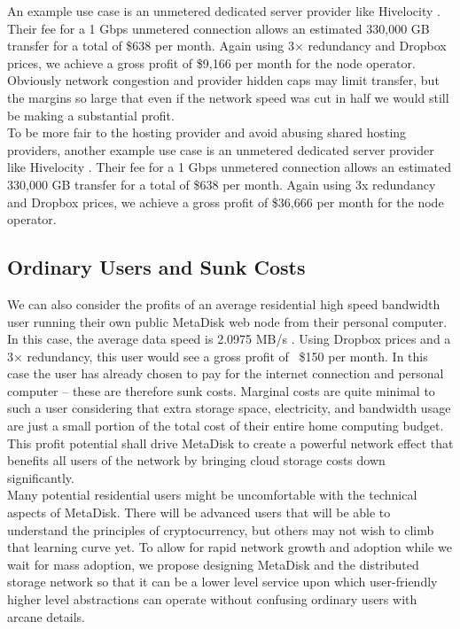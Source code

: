 \documentclass[a4paper,10pt]{article}
\begin{document}
An example use case is an unmetered dedicated server provider like Hivelocity \cite{9}.  Their fee for a 1 Gbps unmetered connection allows an estimated 330,000 GB transfer for a total of \$638 per month. Again using 3× redundancy and Dropbox prices, we achieve a gross profit of \$9,166 per month for the node operator. Obviously network congestion and provider hidden caps may limit transfer, but the margins so large that even if the network speed was cut in half we would still be making a substantial profit. \\

To be more fair to the hosting provider and avoid abusing shared hosting providers, another example use case is an unmetered dedicated server provider like Hivelocity \cite{10}.  Their fee for a 1 Gbps unmetered connection allows an estimated 330,000 GB transfer for a total of \$638 per month. Again using 3x redundancy and Dropbox prices, we achieve a gross profit of \$36,666 per month for the node operator. 

\subsection{Ordinary Users and Sunk Costs}

We can also consider the profits of an average residential high speed bandwidth user running their own public MetaDisk web node from their personal computer. In this case, the average data speed is 2.0975 MB/s \cite{10}. Using Dropbox prices and a 3× redundancy, this user would see a gross profit of ~\$150 per month. In this case the user has already chosen to pay for the internet connection and personal computer -- these are therefore sunk costs. Marginal costs are quite minimal to such a user considering that extra storage space, electricity, and bandwidth usage are just a small portion of the total cost of their entire home computing budget. This profit potential shall drive MetaDisk to create a powerful network effect that benefits all users of the network by bringing cloud storage costs down significantly.\\
 
Many potential residential users might be uncomfortable with the technical aspects of MetaDisk. There will be advanced users that will be able to understand the principles of cryptocurrency, but others may not wish to climb that learning curve yet. To allow for rapid network growth and adoption while we wait for mass adoption, we propose designing MetaDisk and the distributed storage network so that it can be a lower level service upon which user-friendly higher level abstractions can operate without confusing ordinary users with arcane details.\\
\end{document}
